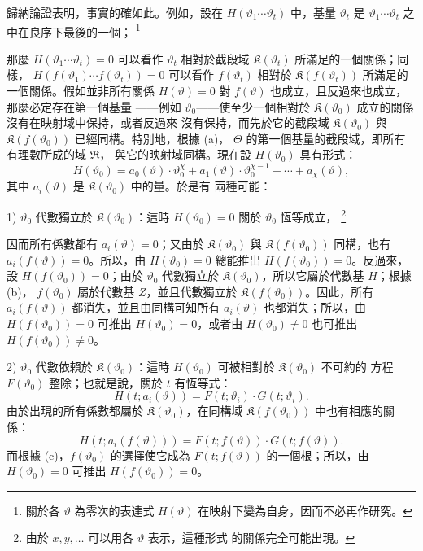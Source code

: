 \documentclass[11pt]{article}
\providecommand{\Kfield}{\mathfrak K}
\providecommand{\Rfield}{\mathfrak R}
\providecommand{\srcfn}[2]{%
  \begingroup\renewcommand{\thefootnote}{#1}\footnote{#2}\addtocounter{footnote}{-1}\endgroup}
\begin{document}
歸納論證表明，事實的確如此。例如，設在
\(H(\vartheta_1\cdots\vartheta_t)\) 中，基量 \(\vartheta_t\) 是
\(\vartheta_1\cdots\vartheta_t\) 之中在良序下最後的一個；
\srcfn{**)}{關於各 \(\vartheta\) 為零次的表達式 \(H(\vartheta)\)
在映射下變為自身，因而不必再作研究。} 那麼
\(H(\vartheta_1\cdots\vartheta_t)=0\) 可以看作 \(\vartheta_t\)
相對於截段域 \(\Kfield(\vartheta_t)\) 所滿足的一個關係；同樣，
\(H(f(\vartheta_1)\cdots f(\vartheta_t))=0\) 可以看作
\(f(\vartheta_t)\) 相對於 \(\Kfield(f(\vartheta_t))\) 所滿足的
一個關係。假如並非所有關係 \(H(\vartheta)=0\) 對
\(f(\vartheta)\) 也成立，且反過來也成立，那麼必定存在第一個基量
——例如 \(\vartheta_0\)——使至少一個相對於
\(\Kfield(\vartheta_0)\) 成立的關係沒有在映射域中保持，或者反過來
沒有保持，而先於它的截段域 \(\Kfield(\vartheta_0)\) 與
\(\Kfield(f(\vartheta_0))\) 已經同構。特別地，根據 (a)，
\(\Theta\) 的第一個基量的截段域，即所有有理數所成的域 \(\Rfield\)，
與它的映射域同構。現在設 \(H(\vartheta_0)\) 具有形式：
\[
H(\vartheta_0)=a_0(\vartheta)\cdot\vartheta_0^\chi
+a_1(\vartheta)\cdot\vartheta_0^{\chi-1}+\cdots+a_\chi(\vartheta),
\]
其中 \(a_i(\vartheta)\) 是 \(\Kfield(\vartheta_0)\) 中的量。於是有
兩種可能：

1) \(\vartheta_0\) 代數獨立於 \(\Kfield(\vartheta_0)\)：這時
\(H(\vartheta_0)=0\) 關於 \(\vartheta_0\) 恆等成立，
\srcfn{*)}{由於 \(x,y,\ldots\) 可以用各 \(\vartheta\) 表示，這種形式
的關係完全可能出現。} 因而所有係數都有
\(a_i(\vartheta)=0\)；又由於 \(\Kfield(\vartheta_0)\) 與
\(\Kfield(f(\vartheta_0))\) 同構，也有
\(a_i(f(\vartheta))=0\)。所以，由 \(H(\vartheta_0)=0\) 總能推出
\(H(f(\vartheta_0))=0\)。反過來，設
\(H(f(\vartheta_0))=0\)；由於 \(\vartheta_0\) 代數獨立於
\(\Kfield(\vartheta_0)\)，所以它屬於代數基 \(H\)；根據 (b)，
\(f(\vartheta_0)\) 屬於代數基 \(Z\)，並且代數獨立於
\(\Kfield(f(\vartheta_0))\)。因此，所有
\(a_i(f(\vartheta))\) 都消失，並且由同構可知所有
\(a_i(\vartheta)\) 也都消失；所以，由
\(H(f(\vartheta_0))=0\) 可推出 \(H(\vartheta_0)=0\)，或者由
\(H(\vartheta_0)\ne0\) 也可推出 \(H(f(\vartheta_0))\ne0\)。

2) \(\vartheta_0\) 代數依賴於 \(\Kfield(\vartheta_0)\)：這時
\(H(\vartheta_0)\) 可被相對於 \(\Kfield(\vartheta_0)\) 不可約的
方程 \(F(\vartheta_0)\) 整除；也就是說，關於 \(t\) 有恆等式：
\[
H(t;a_i(\vartheta))=F(t;\vartheta_i)\cdot G(t;\vartheta_i).
\]
由於出現的所有係數都屬於 \(\Kfield(\vartheta_0)\)，在同構域
\(\Kfield(f(\vartheta_0))\) 中也有相應的關係：
\[
H(t;a_i(f(\vartheta)))=F(t;f(\vartheta))\cdot G(t;f(\vartheta)).
\]
而根據 (c)，\(f(\vartheta_0)\) 的選擇使它成為
\(F(t;f(\vartheta))\) 的一個根；所以，由 \(H(\vartheta_0)=0\)
可推出 \(H(f(\vartheta_0))=0\)。
\end{document}
